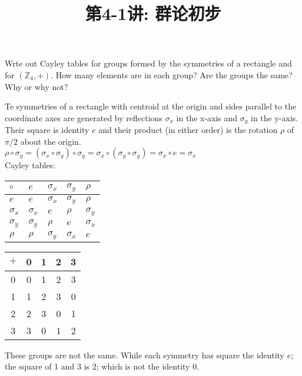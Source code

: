 \documentclass[a4paper, justified]{tufte-handout}
\title{第4-1讲: 群论初步}
\date{\zhtoday} %
\begin{document}
\maketitle
\noplagiarism %
\begin{abstract}
\end{abstract}
\beginrequired

\begin{problem}[TJ 3-3]
Wrte out Cayley tables for groups formed by the symmetries of a rectangle and for $(\mathbb{Z}_4, +)$. How many elements are in each group? Are the groups the same? Why or why not?
\end{problem}

\begin{solution}
	Te symmetries of a rectangle with centroid at the origin and sides parallel to the coordinate axes are generated by reflections $\sigma_x$ in the x-axis and $\sigma_y$ in the y-axis.\\
	Their square is identity $e$ and their product (in either order) is the rotation $\rho $ of $\pi / 2 $ about the origin.\\
	$\rho \circ \sigma_y=(\sigma_x \circ \sigma_y) \circ \sigma_y=\sigma_x\circ (\sigma_y \circ \sigma_y) = \sigma_x \circ e = \sigma_x$\\
	Cayley tables:
	\newpage
	\begin{table}[]
		\begin{tabular}{|l||l|l|l|l|}
			\hline$\circ$    & $e$        & $\sigma_x$ & $\sigma_y$ & $\rho$     \\
			\hline \hline$e$ & $e$        & $\sigma_x$ & $\sigma_y$ & $\rho$     \\
			\hline$\sigma_x$ & $\sigma_x$ & $e$        & $\rho$     & $\sigma_y$ \\
			\hline$\sigma_y$ & $\sigma_y$ & $\rho$     & $e$        & $\sigma_x$ \\
			\hline$\rho$     & $\rho$     & $\sigma_y$ & $\sigma_x$ & $e$        \\
			\hline
		\end{tabular}
		\begin{tabular}{|c||c|c|c|c|}
			\hline$+$       & 0 & 1 & 2 & 3 \\
			\hline \hline 0 & 0 & 1 & 2 & 3 \\
			\hline 1        & 1 & 2 & 3 & 0 \\
			\hline 2        & 2 & 3 & 0 & 1 \\
			\hline 3        & 3 & 0 & 1 & 2 \\
			\hline
		\end{tabular}
	\end{table}
	These groups are not the same. While each symmetry has square the identity $e$; the square of 1 and 3 is 2; which is not the identity 0.
\end{solution}
\end{document}
